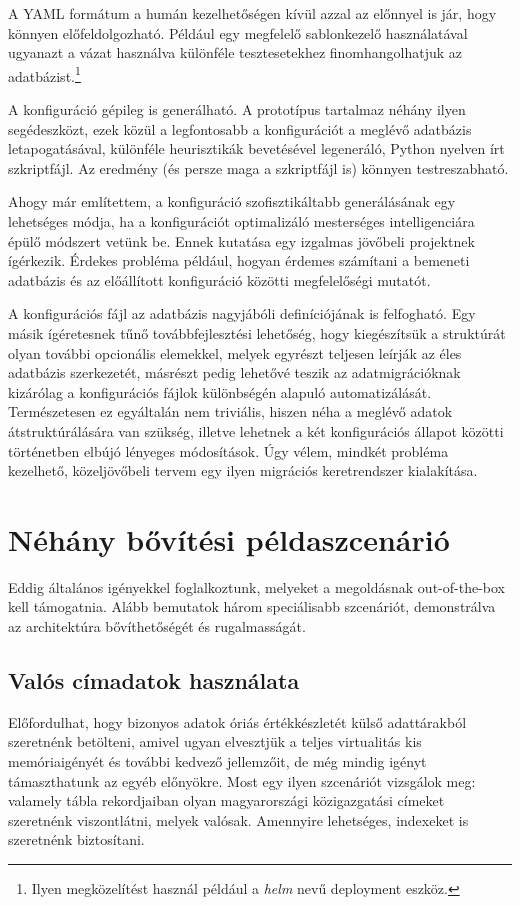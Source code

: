 \documentclass[
    parspace,
    noindent,
    nohyp,
]{elteiktdk}[2023/04/10]
\begin{document}
A YAML formátum a humán kezelhetőségen kívül azzal az előnnyel is jár, hogy könnyen előfeldolgozható.
Például egy megfelelő sablonkezelő használatával ugyanazt a vázat használva
különféle tesztesetekhez finomhangolhatjuk az adatbázist.\footnote{
    Ilyen megközelítést használ például a \textit{helm} nevű deployment eszköz.
}

A konfiguráció gépileg is generálható.
A prototípus tartalmaz néhány ilyen segédeszközt,
ezek közül a legfontosabb a konfigurációt a meglévő adatbázis letapogatásával,
különféle heurisztikák bevetésével legeneráló, Python nyelven írt szkriptfájl.
Az eredmény (és persze maga a szkriptfájl is) könnyen testreszabható.

Ahogy már említettem, a konfiguráció szofisztikáltabb generálásának egy lehetséges módja,
ha a konfigurációt optimalizáló mesterséges intelligenciára épülő módszert vetünk be.
Ennek kutatása egy izgalmas jövőbeli projektnek ígérkezik.
Érdekes probléma például, hogyan érdemes számítani a bemeneti adatbázis
és az előállított konfiguráció közötti megfelelőségi mutatót.

A konfigurációs fájl az adatbázis nagyjábóli definíciójának is felfogható.
Egy másik ígéretesnek tűnő továbbfejlesztési lehetőség,
hogy kiegészítsük a struktúrát olyan további opcionális elemekkel,
melyek egyrészt teljesen leírják az éles adatbázis szerkezetét,
másrészt pedig lehetővé teszik az adatmigrációknak
kizárólag a konfigurációs fájlok különbségén alapuló automatizálását.
Természetesen ez egyáltalán nem triviális,
hiszen néha a meglévő adatok átstruktúrálására van szükség,
illetve lehetnek a két konfigurációs állapot közötti történetben elbújó lényeges módosítások.
Úgy vélem, mindkét probléma kezelhető,
közeljövőbeli tervem egy ilyen migrációs keretrendszer kialakítása.

\section{Néhány bővítési példaszcenárió}

Eddig általános igényekkel foglalkoztunk,
melyeket a megoldásnak out-of-the-box kell támogatnia.
Alább bemutatok három speciálisabb szcenáriót,
demonstrálva az architektúra bővíthetőségét és rugalmasságát.

\subsection{Valós címadatok használata}

Előfordulhat, hogy bizonyos adatok óriás értékkészletét külső adattárakból szeretnénk betölteni,
amivel ugyan elvesztjük a teljes virtualitás kis memóriaigényét és további kedvező jellemzőit,
de még mindig igényt támaszthatunk az egyéb előnyökre.
Most egy ilyen szcenáriót vizsgálok meg:
valamely tábla rekordjaiban olyan magyarországi közigazgatási címeket szeretnénk viszontlátni,
melyek valósak.
Amennyire lehetséges, indexeket is szeretnénk biztosítani.
\end{document}
